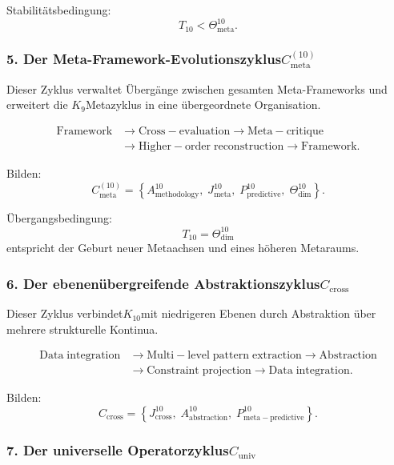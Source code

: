 Stabilitätsbedingung:
\[
  T_{10} < \Theta^{10}_{\mathrm{meta}}.
\]


\subsubsection{5. Der Meta-Framework-Evolutionszyklus$C_{\mathrm{meta}}^{(10)}$}

Dieser Zyklus verwaltet Übergänge zwischen gesamten Meta-Frameworks und erweitert die
$K_9$Metazyklus in eine übergeordnete Organisation.

\[
  \begin{aligned}
  \mathrm{Framework}
  &\to \mathrm{Cross\!-\!evaluation}
  \to \mathrm{Meta\!-\!critique}\\
  &\to \mathrm{Higher\!-\!order\;reconstruction}
  \to \mathrm{Framework}.
  \end{aligned}
\]

Bilden:
\[
  C_{\mathrm{meta}}^{(10)}
   =
   \left\{
     A^{10}_{\mathrm{methodology}},\;
     J^{10}_{\mathrm{meta}},\;
     P^{10}_{\mathrm{predictive}},\;
     \Theta^{10}_{\mathrm{dim}}
   \right\}.
\]

Übergangsbedingung:
\[
  T_{10} = \Theta^{10}_{\mathrm{dim}}
\]
entspricht der Geburt neuer Metaachsen und eines höheren Metaraums.


\subsubsection{6. Der ebenenübergreifende Abstraktionszyklus$C_{\mathrm{cross}}$}

Dieser Zyklus verbindet$K_{10}$mit niedrigeren Ebenen durch Abstraktion über mehrere
strukturelle Kontinua.

\[
  \begin{aligned}
  \mathrm{Data\;integration}
  &\to \mathrm{Multi\!-\!level\;pattern\;extraction}
  \to \mathrm{Abstraction}\\
  &\to \mathrm{Constraint\;projection}
  \to \mathrm{Data\;integration}.
  \end{aligned}
\]

Bilden:
\[
  C_{\mathrm{cross}}
  =
  \left\{
    J^{10}_{\mathrm{cross}},\;
    A^{10}_{\mathrm{abstraction}},\;
    P^{10}_{\mathrm{meta\!-\!predictive}}
  \right\}.
\]


\subsubsection{7. Der universelle Operatorzyklus$C_{\mathrm{univ}}$}

